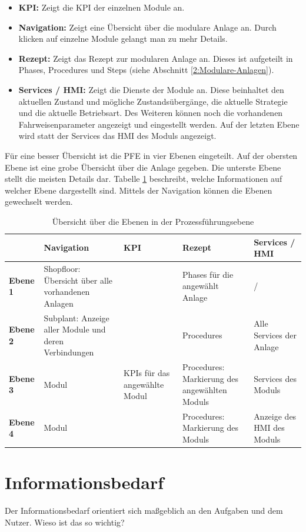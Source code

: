 \begin{itemize}
\item \textbf{KPI:} Zeigt die KPI der einzelnen Module an.
\item \textbf{Navigation:} Zeigt eine Übersicht über die modulare Anlage an. Durch klicken auf einzelne Module gelangt man zu mehr Details.
\item \textbf{Rezept:} Zeigt das Rezept zur modularen Anlage an. Dieses ist aufgeteilt in Phases, Procedures und Steps (siehe Abschnitt \ref{2:Modulare-Anlagen}).
\item \textbf{Services / HMI:} Zeigt die Dienste der Module an. Diese beinhaltet den aktuellen Zustand und mögliche Zustandsübergänge, die aktuelle Strategie  und die aktuelle Betriebsart. Des Weiteren können noch die vorhandenen Fahrweisenparameter angezeigt und eingestellt werden. Auf der letzten Ebene wird statt der Services das HMI des Moduls angezeigt.
\end{itemize}
Für eine besser Übersicht ist die PFE in vier Ebenen eingeteilt. Auf der obersten Ebene ist eine grobe Übersicht über die Anlage gegeben. Die unterste Ebene stellt die meisten Details dar. Tabelle \ref{tab:Ebenen-PFE} beschreibt, welche Informationen auf welcher Ebene dargestellt sind. Mittels der Navigation können die Ebenen gewechselt werden. 
\begin{table}[htbp]
\centering
\begin{tabular}{p{}|p{}|p{}|p{}|p{}|}
 & \textbf{Navigation} & \textbf{KPI} & \textbf{Rezept} & \textbf{Services / HMI} \\
\hline
\textbf{Ebene 1} & Shopfloor: Übersicht über alle vorhandenen Anlagen & & Phases für die angewählt Anlage & / \\
\hline
\textbf{Ebene 2} & Subplant: Anzeige aller Module und deren Verbindungen & & Procedures & Alle Services der Anlage \\
\hline
\textbf{Ebene 3} & Modul & KPIs für das angewählte Modul & Procedures: Markierung des angewählten Moduls & Services des Moduls \\
\hline \textbf{Ebene 4} & Modul & & Procedures: Markierung des Moduls & Anzeige des HMI des Moduls \\
\hline
\end{tabular}
\label{tab:Ebenen-PFE}
\caption{Übersicht über die Ebenen in der Prozessführungsebene}
\end{table}


\section{Informationsbedarf}
Der Informationsbedarf orientiert sich maßgeblich an den Aufgaben und dem Nutzer. Wieso ist das so wichtig? 

